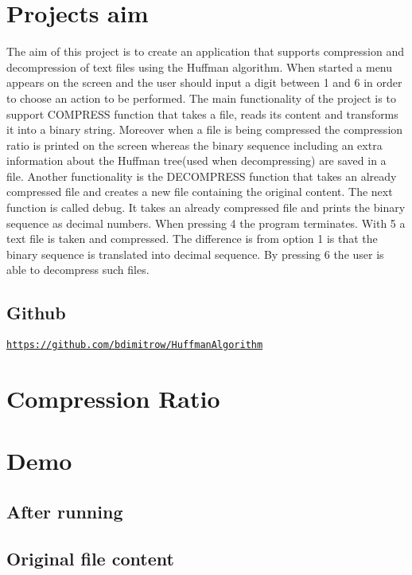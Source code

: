 \hypertarget{index_First}{}\section{Project\textquotesingle{}s aim}\label{index_First}
The aim of this project is to create an application that supports compression and decompression of text files using the Huffman algorithm. When started a menu appears on the screen and the user should input a digit between 1 and 6 in order to choose an action to be performed. The main functionality of the project is to support C\+O\+M\+P\+R\+E\+SS function that takes a file, reads its content and transforms it into a binary string. Moreover when a file is being compressed the compression ratio is printed on the screen whereas the binary sequence including an extra information about the Huffman tree(used when decompressing) are saved in a file. Another functionality is the D\+E\+C\+O\+M\+P\+R\+E\+SS function that takes an already compressed file and creates a new file containing the original content. The next function is called debug. It takes an already compressed file and prints the binary sequence as decimal numbers. When pressing 4 the program terminates. With 5 a text file is taken and compressed. The difference is from option 1 is that the binary sequence is translated into decimal sequence. By pressing 6 the user is able to decompress such files.\hypertarget{index_Github}{}\subsection{Github}\label{index_Github}
\href{https://github.com/bdimitrow/HuffmanAlgorithm}{\tt https\+://github.\+com/bdimitrow/\+Huffman\+Algorithm}\hypertarget{index_Second}{}\section{Compression Ratio}\label{index_Second}
\hypertarget{index_Third}{}\section{Demo}\label{index_Third}
\hypertarget{index_one}{}\subsection{After running}\label{index_one}
\hypertarget{index_two}{}\subsection{Original file content}\label{index_two}
